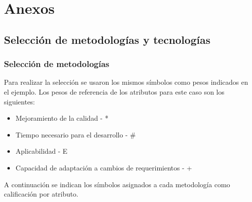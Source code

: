 \documentclass{article}
\begin{document}
\section{Anexos}
\subsection{Selección de metodologías y tecnologías}
\subsubsection{Selección de metodologías}
Para realizar la selección se usaron los mismos símbolos como pesos indicados en el ejemplo. Los pesos de referencia de los atributos para este caso son los siguientes:
\begin{itemize}
    \item Mejoramiento de la calidad - *
    \item Tiempo necesario para el desarrollo - \#
    \item Aplicabilidad - E
    \item Capacidad de adaptación a cambios de requerimientos - +
\end{itemize}
A continuación se indican los símbolos asignados a cada metodología como calificación por atributo.
\end{document}
